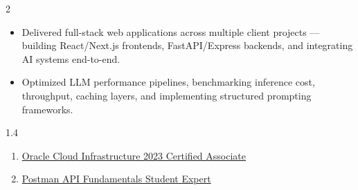 \documentclass[11pt,a4paper,ragged2e,withhyper]{altacv}
\begin{document}
\begin{paracol}{2}
\begin{itemize}
\item Delivered full-stack web applications across multiple client projects --- building React/Next.js frontends, FastAPI/Express backends, and integrating AI systems end-to-end.
\item Optimized LLM performance pipelines, benchmarking inference cost, throughput, caching layers, and implementing structured prompting frameworks.
\end{itemize}
\par\smallskip
{}
\begin{spacing}{1.4}
\par\smallskip
\par\smallskip
\par\smallskip
\par\smallskip
\par\smallskip
\par\smallskip
\end{spacing}
\begin{enumerate}
  \item \href{https://catalog-education.oracle.com/ords/certview/sharebadge?id=B68FCC0253F18758C640802558E542169247F8910E4D24EA865CAAA5F4EC4CA0}{Oracle Cloud Infrastructure 2023 Certified Associate}
  \item \href{https://badges.parchment.com/public/assertions/WBYKt7SFT_-y9xysk8eU3g}{Postman API Fundamentals Student Expert}
\end{enumerate}
\par\smallskip

\end{paracol}
\end{document}
